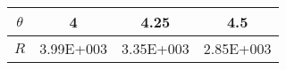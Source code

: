 \begin{tabular}{c|ccc}
$\theta$  & 4 & 4.25 & 4.5 \\ \hline 
$R$  & 3.99E+003 & 3.35E+003 & 2.85E+003 \\ 
 \end{tabular}
